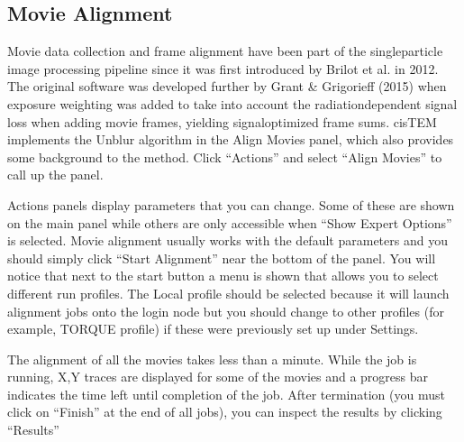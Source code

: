 \documentclass[a4paper,10pt,english]{sphinxmanual}
\begin{document}


\subsection{Movie Alignment}
\label{\detokenize{cisTEM:movie-alignment}}
\sphinxAtStartPar
Movie data collection and frame alignment have been part of the single\sphinxhyphen{}particle image processing pipeline since it was first introduced by Brilot et al. in 2012. The original software  was developed further by Grant \& Grigorieff (2015) when exposure weighting was added to take into account the radiation\sphinxhyphen{}dependent signal loss when adding movie frames, yielding signal\sphinxhyphen{}optimized frame sums. cisTEM implements the Unblur algorithm in the Align Movies panel, which also provides some background to the method. Click “Actions” and select “Align Movies” to call up the panel.


\sphinxAtStartPar
Actions panels display parameters that you can change. Some of these are shown on the main panel while others are only accessible when “Show Expert Options” is selected.
Movie alignment usually works with the default parameters and you should simply click “Start Alignment” near the bottom of the panel.
You will notice that next to the start button a menu is shown that allows you to select different run profiles.
The Local profile should  be selected because it will launch alignment jobs onto the login node but you should change to other profiles (for example, TORQUE profile)
if these were previously set up under Settings.

\sphinxAtStartPar
The alignment of all the  movies takes less than a minute. While the job is running, X,Y traces are displayed for some of the movies and a progress bar indicates the time left until completion of the job.
After termination (you must click on “Finish” at the end of all jobs), you can inspect the results by clicking “Results”

\end{document}

